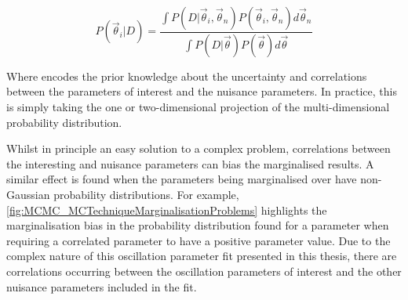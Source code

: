 \begin{equation}
P(\vec{\theta}_{i}|D) = \frac{\int P(D|\vec{\theta}_{i},\vec{\theta}_{n}) P(\vec{\theta}_{i},\vec{\theta}_{n}) d\vec{\theta}_{n}}{\int P(D|\vec{\theta}) P(\vec{\theta}) d\vec{\theta}}
\end{equation}

Where  encodes the prior knowledge about the uncertainty and correlations between the parameters of interest and the nuisance parameters. In practice, this is simply taking the one or two-dimensional projection of the multi-dimensional probability distribution.

Whilst in principle an easy solution to a complex problem, correlations between the interesting and nuisance parameters can bias the marginalised results. A similar effect is found when the parameters being marginalised over have non-Gaussian probability distributions. For example, \autoref{fig:MCMC_MCTechniqueMarginalisationProblems} highlights the marginalisation bias in the probability distribution found for a parameter when requiring a correlated parameter to have a positive parameter value. Due to the complex nature of this oscillation parameter fit presented in this thesis, there are  correlations occurring between the oscillation parameters of interest and the other nuisance parameters included in the fit.

